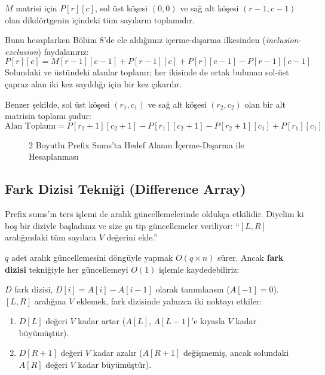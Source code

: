 \begin{definition}
$M$ matrisi için $P[r][c]$, sol üst köşesi $(0, 0)$ ve sağ alt köşesi $(r-1, c-1)$ olan dikdörtgenin içindeki tüm sayıların toplamıdır.
\end{definition}

Bunu hesaplarken Bölüm 8'de ele aldığımız içerme-dışarma ilkesinden (\emph{inclusion-exclusion}) faydalanırız:
\[
P[r][c] = M[r-1][c-1] + P[r-1][c] + P[r][c-1] - P[r-1][c-1]
\]
Solundaki ve üstündeki alanlar toplanır; her ikisinde de ortak bulunan sol-üst çapraz alan iki kez sayıldığı için bir kez çıkarılır.

Benzer şekilde, sol üst köşesi $(r_1, c_1)$ ve sağ alt köşesi $(r_2, c_2)$ olan bir alt matrisin toplamı şudur:
\[
\text{Alan Toplamı} = P[r_2+1][c_2+1] - P[r_1][c_2+1] - P[r_2+1][c_1] + P[r_1][c_1]
\]

\begin{figure}[h]
\centering
{}
\caption{2 Boyutlu Prefix Sums'ta Hedef Alanın İçerme-Dışarma ile Hesaplanması}
\end{figure}

\subsection{Fark Dizisi Tekniği (Difference Array)}
Prefix sums'ın ters işlemi de aralık güncellemelerinde oldukça etkilidir. Diyelim ki boş bir diziyle başladınız ve size şu tip güncellemeler veriliyor: ``$[L, R]$ aralığındaki tüm sayılara $V$ değerini ekle.''

$q$ adet aralık güncellemesini döngüyle yapmak $O(q \times n)$ sürer. Ancak \textbf{fark dizisi} tekniğiyle her güncellemeyi $O(1)$ işlemle kaydedebiliriz:

$D$ fark dizisi, $D[i] = A[i] - A[i-1]$ olarak tanımlansın ($A[-1]=0$). $[L, R]$ aralığına $V$ eklemek, fark dizisinde yalnızca iki noktayı etkiler:
\begin{enumerate}
    \item $D[L]$ değeri $V$ kadar artar ($A[L]$, $A[L-1]$'e kıyasla $V$ kadar büyümüştür).
    \item $D[R+1]$ değeri $V$ kadar azalır ($A[R+1]$ değişmemiş, ancak solundaki $A[R]$ değeri $V$ kadar büyümüştür).
\end{enumerate}

